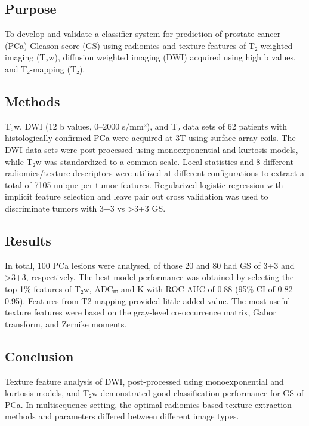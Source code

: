 
\subsection*{Purpose}

To develop and validate a classifier system for prediction of prostate cancer
(PCa) Gleason score (GS) using radiomics and texture features of T₂-weighted
imaging (T₂w), diffusion weighted imaging (DWI) acquired using high b values,
and T₂-mapping (T₂).


\subsection*{Methods}

T₂w, DWI (12 b values, 0--2000 s/mm²), and T₂ data sets of 62 patients with
histologically confirmed PCa were acquired at 3T using surface array coils. The
DWI data sets were post-processed using monoexponential and kurtosis models,
while T₂w was standardized to a common scale. Local statistics and 8 different
radiomics/texture descriptors were utilized at different configurations to
extract a total of 7105 unique per-tumor features. Regularized logistic
regression with implicit feature selection and leave pair out cross validation
was used to discriminate tumors with 3+3 vs >3+3 GS\@.


\subsection*{Results}

In total, 100 PCa lesions were analysed, of those 20 and 80 had GS of 3+3 and
>3+3, respectively. The best model performance was obtained by selecting the top
1\% features of T₂w, ADCₘ and K with ROC AUC of 0.88 (95\% CI of 0.82--0.95).
Features from T2 mapping provided little added value. The most useful texture
features were based on the gray-level co-occurrence matrix, Gabor transform, and
Zernike moments.


\subsection*{Conclusion}

Texture feature analysis of DWI, post-processed using monoexponential and
kurtosis models, and T₂w demonstrated good classification performance for GS of
PCa. In multisequence setting, the optimal radiomics based texture extraction
methods and parameters differed between different image types.
